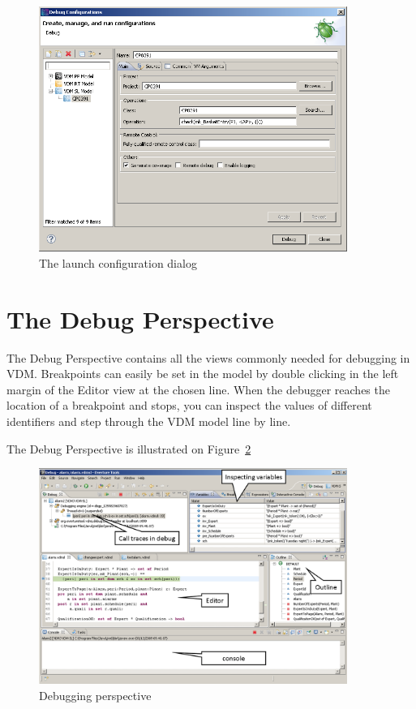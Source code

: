 \documentclass{overturerepchap}
\begin{document}
\begin{figure}[htp]
\begin{center}
  \includegraphics[width=380px]{screenDumps/launchconfig}
  \caption{The launch configuration dialog}
  \label{fig:userguide:launchconfig}
\end{center}
\end{figure}

\section{The Debug Perspective}

The Debug Perspective contains all the views
commonly needed for debugging in VDM. Breakpoints can easily be set in the
model by double clicking in the left margin of the Editor view at the chosen
line. When the debugger reaches the location of a breakpoint and stops, you can
inspect the values of different identifiers and step through the VDM model 
line by line.
 
The Debug Perspective is illustrated on Figure~\ref{fig:userguide:DebuggingVDM}

\begin{figure}[htp]
\begin{center}
  \includegraphics[width=380px]{figures/DebuggingVDM}
  \caption[Debugging perspective]{Debugging perspective}
  \label{fig:userguide:DebuggingVDM}
\end{center}
\end{figure}
\end{document}

